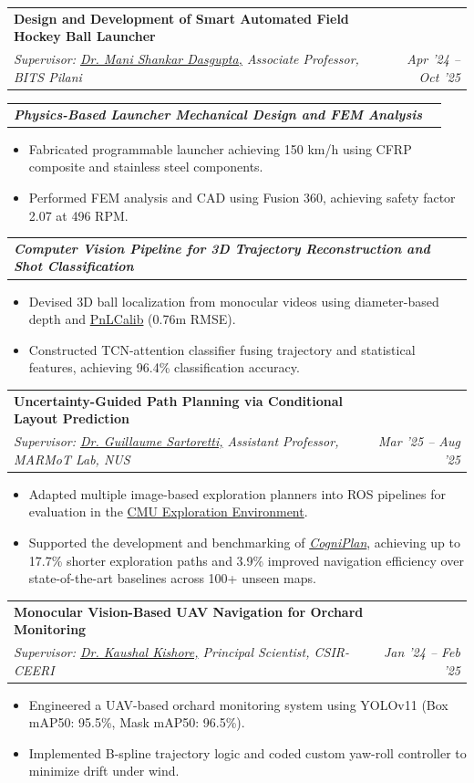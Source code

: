 \documentclass[letterpaper,10pt]{article}
\makeatletter
\newcommand{\resumeItem}[1]{
  \item \small{#1\vspace{-2pt}}
}
\newcommand{\resumeSubheading}[4]{
  \vspace{0pt}\item
  \begin{tabular*}{0.97\textwidth}[t]{l@{\extracolsep{\fill}}r}
    \textbf{#1} & \textbf{#2} \\
    \textit{\small #3} & \textit{\small #4} \\
  \end{tabular*}\vspace{-6pt}
}
\newcommand{\resumeSubSubheading}[2]{
  \vspace{0pt}\item
  \begin{tabular*}{0.97\textwidth}[t]{l@{\extracolsep{\fill}}r}
    \textit{\small #1} & \textit{\small #2} \\
  \end{tabular*}\vspace{-6pt}
}
\newcommand{\resumeItemListStart}{
  \begin{itemize}[leftmargin=0.18in]
}
\newcommand{\resumeItemListEnd}{
  \end{itemize}\vspace{-6pt}
}
\makeatother
\begin{document}
  \resumeSubheading
    {Design and Development of Smart Automated Field Hockey Ball Launcher \color{blue}\href{https://drive.google.com/file/d/1h7X9fIiih37ivgERVR-wbWsDEil0qvpI/view?usp=drive_link}{\faExternalLink*}}{}
    {Supervisor: {\color{blue}\href{https://www.bits-pilani.ac.in/pilani/m-s-dasgupta/}{Dr. Mani Shankar Dasgupta,}} Associate Professor, BITS Pilani}{Apr '24 -- Oct '25}

    \resumeSubSubheading
      {\textbf{\hspace{4pt}Physics-Based Launcher Mechanical Design and FEM Analysis}}{}
    \resumeItemListStart
      \resumeItem{Fabricated programmable launcher achieving 150 km/h using CFRP composite and stainless steel components.}
      \resumeItem{Performed FEM analysis and CAD using Fusion 360, achieving safety factor 2.07 at 496 RPM.}
    \resumeItemListEnd

    \resumeSubSubheading
      {\textbf{\hspace{4pt}Computer Vision Pipeline for 3D Trajectory Reconstruction and Shot Classification}}{}
    \resumeItemListStart
      \resumeItem{Devised 3D ball localization from monocular videos using diameter-based depth and {\color{blue}\href{https://github.com/mguti97/PnLCalib}{PnLCalib}}  (0.76m RMSE).}
      \resumeItem{Constructed TCN-attention classifier fusing trajectory and statistical features, achieving 96.4\% classification accuracy.}
    \resumeItemListEnd

  \resumeSubheading
    {Uncertainty-Guided Path Planning via Conditional Layout Prediction \color{blue}\href{https://yizhuo-wang.com/cogniplan/}{\faExternalLink*}}{}
    {Supervisor: {\color{blue}\href{https://cde.nus.edu.sg/me/staff/sartoretti-guillaume-a/}{Dr. Guillaume Sartoretti,}} Assistant Professor, MARMoT Lab, NUS}{Mar '25 -- Aug '25}
  \resumeItemListStart
    \resumeItem{Adapted multiple image-based exploration planners into ROS pipelines for evaluation in the \color{blue}\href{https://www.cmu-exploration.com/}{CMU Exploration Environment}.}
    \resumeItem{Supported the development and benchmarking of \textit{\color{blue}\href{https://yizhuo-wang.com/cogniplan/}{CogniPlan}}, achieving up to 17.7\% shorter exploration paths and 3.9\% improved navigation efficiency over state-of-the-art baselines across 100+ unseen maps.}
  \resumeItemListEnd

  \resumeSubheading
    {Monocular Vision-Based UAV Navigation for Orchard Monitoring \color{blue}\href{https://github.com/Ritabrata-Chakraborty/Monocular-Vision-Based-UAV-Navigation-for-Orchard-Monitoring.git}{\faExternalLink*}}{}
    {Supervisor: {\color{blue}\href{https://ieeexplore.ieee.org/author/37085653936}{Dr. Kaushal Kishore,}} Principal Scientist, CSIR-CEERI}{Jan '24 -- Feb '25}
  \resumeItemListStart
    \resumeItem{Engineered a UAV-based orchard monitoring system using YOLOv11 (Box mAP50: 95.5\%, Mask mAP50: 96.5\%).}
    \resumeItem{Implemented B-spline trajectory logic and coded custom yaw-roll controller to minimize drift under wind.}
  \resumeItemListEnd
\end{document}
